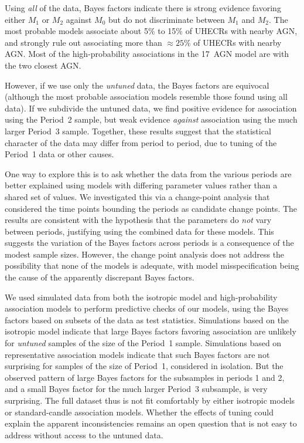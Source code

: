 Using {\em all} of the data, Bayes factors indicate there is strong evidence
favoring either $M_1$ or $M_2$ against $M_0$ but do not discriminate between
$M_1$ and $M_2$.  The most probable models associate about 5\% to 15\% of
UHECRs with nearby AGN, and strongly rule out associating more than
$\approx 25$\% of UHECRs with nearby AGN.  Most of the high-probability
associations in the 17~AGN model are with the two closest AGN.

However, if we use only the {\em untuned} data, the Bayes factors are
equivocal (although the most probable association models resemble those
found using all data).  If we subdivide the untuned data, we find positive
evidence for association using the Period~2 sample, but weak evidence {\em
against} association using the much larger Period~3 sample.  Together, these
results suggest that the statistical character of the data may differ from
period to period, due to tuning of the Period~1 data or other causes.

One way to explore this is to ask whether the data from the various periods
are better explained using models with differing parameter values rather
than a shared set of values.  We investigated this via a change-point
analysis that considered the time points bounding the periods as candidate
change points.  The results are consistent with the hypothesis that the
parameters do {\em not} vary between periods, justifying using the combined
data for these models.  This suggests the variation of the Bayes factors
across periods is a consequence of the modest sample sizes.  However, the
change point analysis does not address the possibility that none of the
models is adequate, with model misspecification being the cause of the
apparently discrepant Bayes factors.

We used simulated data from both the isotropic model and
high-probability association models to perform predictive checks of our
models, using the Bayes factors based on subsets of the data as test
statistics.  Simulations based on the isotropic model indicate that large
Bayes factors favoring association are unlikely for {\em untuned} samples of
the size of the Period~1 sample.  Simulations based on representative
association models indicate that such Bayes factors are not surprising
for samples of the size of Period~1, considered in isolation.  But
the observed pattern of large Bayes factors for the subsamples in
periods 1 and 2, and a small Bayes factor for the much larger Period~3
subsample, is very surprising.  The full dataset thus is not fit
comfortably by either isotropic models or standard-candle association
models.
Whether the effects of tuning could explain the apparent inconsistencies
remains an open question that is not easy to address without access to the
untuned data.

